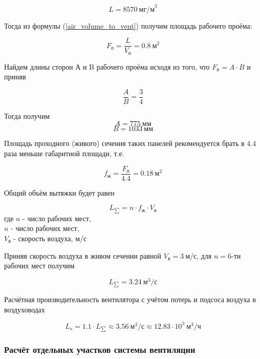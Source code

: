 $$
    L = 8570 ~\text{мг/м}^3
$$

Тогда из формулы (\ref{air_volume_to_vent}) получим площадь рабочего проёма:

\begin{equation}
\label{working_window_area}
    F_\text{п} = \frac{L}{V_\text{п}} = 0.8 ~\text{м}^2
\end{equation}

Найдем длины сторон А и B рабочего проёма исходя из того, что $F_\text{п}  = A \cdot B$ и приняв

\begin{equation}
\label{working_window_area_sides_ratio}
    \frac{A}{B} = \frac{3}{4}
\end{equation}

Тогда получим
$$
    A = 775 ~\text{мм}
$$
$$
    B = 1033 ~\text{мм}
$$

Площадь проходного (живого) сечения таких панелей рекомендуется брать в 4.4
раза меньше габаритной площади, т.е.

\begin{equation}
\label{alive_section_are}
    f_\text{ж} = \frac{F_\text{п}}{4.4} = 0.18 ~\text{м}^2
\end{equation}

Общий объём вытяжки будет равен

\begin{equation}
\label{overall_sucktion_volume}
    L_{\sum} = n \cdot f_\text{ж} \cdot V_\text{в}
\end{equation}
где $n$ - число рабочих мест,                   \\
$n$ - число рабочих мест,                       \\
$V_\text{в}$ - скорость воздуха, $\text{м/с}$

Приняв скорость воздуха в живом сечении равной $V_\text{в} = 3 ~\text{м/с}$,
для $n = 6$-ти рабочих мест получим

$$
    L_{\sum} = 3.24 ~\text{м}^3 / \text{с}
$$

Расчётная производительность вентилятора с учётом потерь и подсоса воздуха
в воздуховодах

\begin{equation}
\label{fan_productivity}
    L_s = 1.1 \cdot L_{\sum}
        \approx 3.56 ~\text{м}^3 / \text{с}
        \approx 12.83 \cdot 10^3 ~\text{м}^3 / \text{ч}
\end{equation}

\subsubsection{Расчёт отдельных участков системы вентиляции}

